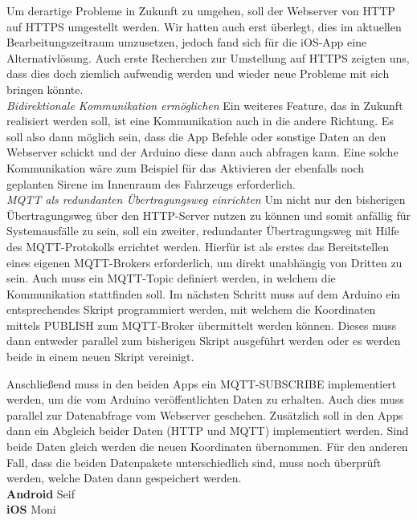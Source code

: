 Um derartige Probleme in Zukunft zu umgehen, soll der Webserver von HTTP auf HTTPS umgestellt werden. Wir hatten auch erst überlegt, dies im aktuellen Bearbeitungszeitraum umzusetzen, jedoch fand sich für die iOS-App eine Alternativlösung. Auch erste Recherchen zur Umstellung auf HTTPS zeigten uns, dass dies doch ziemlich aufwendig werden und wieder neue Probleme mit sich bringen könnte.
\\
\textit{Bidirektionale Kommunikation ermöglichen}
Ein weiteres Feature, das in Zukunft realisiert werden soll, ist eine Kommunikation auch in die andere Richtung. Es soll also dann möglich sein, dass die App Befehle oder sonstige Daten an den Webserver schickt und der Arduino diese dann auch abfragen kann. Eine solche Kommunikation wäre zum Beispiel für das Aktivieren der ebenfalls noch geplanten Sirene im Innenraum des Fahrzeugs erforderlich.
\\
\textit{MQTT als redundanten Übertragungsweg einrichten}
Um nicht nur den bisherigen Übertragungsweg über den HTTP-Server nutzen zu können und somit anfällig für Systemausfälle zu sein, soll ein zweiter, redundanter Übertragungsweg mit Hilfe des MQTT-Protokolls errichtet werden. Hierfür ist als erstes das Bereitstellen eines eigenen MQTT-Brokers erforderlich, um direkt unabhängig von Dritten zu sein. Auch muss ein MQTT-Topic definiert werden, in welchem die Kommunikation stattfinden soll. Im nächsten Schritt muss auf dem Arduino ein entsprechendes Skript programmiert werden, mit welchem die Koordinaten mittels PUBLISH zum MQTT-Broker übermittelt werden können. Dieses muss dann entweder parallel zum bisherigen Skript ausgeführt werden oder es werden beide in einem neuen Skript vereinigt.

 Anschließend muss in den beiden Apps ein MQTT-SUBSCRIBE implementiert werden, um die vom Arduino veröffentlichten Daten zu erhalten. Auch dies muss parallel zur Datenabfrage vom Webserver geschehen. Zusätzlich soll in den Apps dann ein Abgleich beider Daten (HTTP und MQTT) implementiert werden. Sind beide Daten gleich werden die neuen Koordinaten übernommen. Für den anderen Fall, dass die beiden Datenpakete unterschiedlich sind, muss noch überprüft werden, welche Daten dann gespeichert werden. 
 \\
\textbf{Android} Seif
\\
\textbf{iOS} Moni